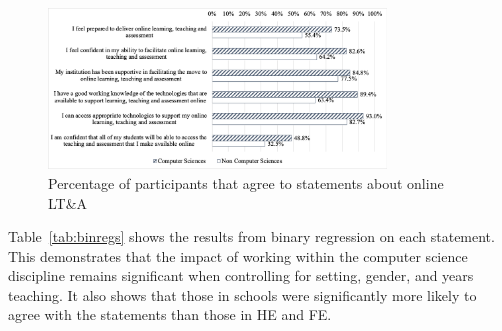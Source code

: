 \documentclass[sigconf]{acmart}
\begin{document}
\begin{figure}
\includegraphics[width=0.8\textwidth]{images/particagree.png}
\caption{Percentage of participants that agree to statements about
  online LT\&A}
\label{fig:partagree}
\end{figure}

Table~\ref{tab:binregs} shows the results from binary regression on each
statement. This demonstrates that the impact of working within the
computer science discipline remains significant when controlling for
setting, gender, and years teaching. It also shows that those in
schools were significantly more likely to agree with the statements
than those in HE and FE.
\end{document}
